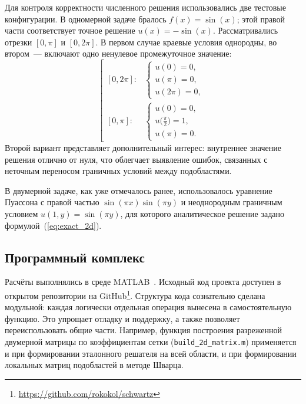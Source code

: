 Для контроля корректности численного решения использовались две тестовые
конфигурации. В одномерной задаче бралось $f(x)=\sin(x)$; этой правой части
соответствует точное решение $u(x)=-\sin(x)$. Рассматривались отрезки
$[0,\pi]$ и $[0,2\pi]$. В первом случае краевые условия однородны, во
втором~--- включают одно ненулевое промежуточное значение:
\begin{equation}\label{eq:test_bc}
    \left[\begin{array}{ll}
    \displaystyle[0,2\pi]:&
    \begin{cases}
        u(0)=0,\\
        u(\pi)=0,\\
        u(2\pi)=0,
    \end{cases}\\[20pt]
    \displaystyle[0,\pi]:&
    \begin{cases}
        u(0)=0,\\
        u\bigl(\tfrac{\pi}{2}\bigr)=1,\\
        u(\pi)=0.
    \end{cases}
    \end{array}\right.
\end{equation}
Второй вариант представляет дополнительный интерес: внутреннее значение
решения отлично от нуля, что облегчает выявление ошибок, связанных с
неточным переносом граничных условий между подобластями.

В двумерной задаче, как уже отмечалось ранее, использовалось уравнение
Пуассона с правой частью $\sin(\pi x)\sin(\pi y)$ и неоднородным граничным
условием $u(1,y)=\sin(\pi y)$, для которого аналитическое решение задано
формулой~(\ref{eq:exact_2d}).


\subsection{Программный комплекс}

Расчёты выполнялись в среде MATLAB~\cite{matlab2023}. Исходный код проекта
доступен в открытом репозитории на GitHub\footnote{%
\url{https://github.com/rokokol/schwartz}}. Структура кода сознательно
сделана модульной: каждая логически отдельная операция вынесена в
самостоятельную функцию. Это упрощает отладку и поддержку, а также позволяет
переиспользовать общие части. Например, функция построения разреженной
двумерной матрицы по коэффициентам сетки (\texttt{build\_2d\_matrix.m})
применяется и при формировании эталонного решателя на всей области, и при
формировании локальных матриц подобластей в методе Шварца.

